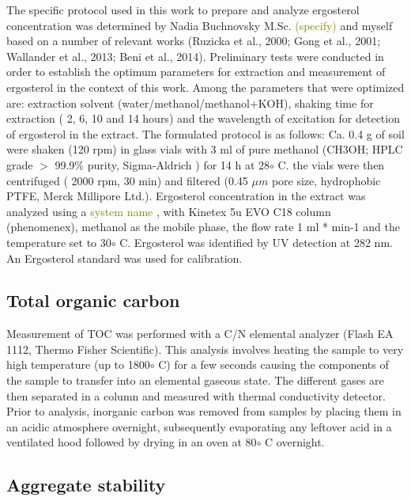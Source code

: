 \documentclass[12pt]{report}
\newcommand{\myGreen}[1]{\textcolor{olive}{#1}} %
\begin{document}
The specific protocol used in this work to prepare and analyze ergosterol concentration was determined by Nadia Buchnovsky M.Sc. \myGreen{(specify)} and myself based on a number of relevant works (Ruzicka et al., 2000; Gong et al., 2001; Wallander et al., 2013; Beni et al., 2014). Preliminary tests were conducted in order to establish the optimum parameters for extraction and measurement of ergosterol in the context of this work. Among the parameters that were optimized are: extraction solvent (water/methanol/methanol+KOH), shaking time for extraction ( 2, 6, 10 and 14 hours) and the wavelength of excitation for detection of ergosterol in the extract. The formulated protocol is as follows: Ca. 0.4 g of soil were shaken (120 rpm) in glass vials with 3 ml of pure methanol (CH3OH; HPLC grade $ > $ 99.9\% purity, Sigma-Aldrich ) for 14 h at 28$ \circ $ C. the vials were then centrifuged ( 2000 rpm, 30 min) and filtered (0.45 $ \mu m $ pore size, hydrophobic PTFE, Merck Millipore Ltd.). Ergosterol concentration in the extract was analyzed using a \myGreen{system name} , with Kinetex 5u EVO C18 column (phenomenex), methanol as the mobile phase, the flow rate 1 ml * min-1 and the temperature set to 30$ \circ $  C. Ergosterol was identified by UV detection at 282 nm. An Ergosterol standard was used for calibration.


\subsection{Total organic carbon}

Measurement of TOC was performed with a C/N elemental analyzer (Flash EA 1112, Thermo Fisher Scientific). This analysis involves heating the sample to very high temperature (up to 1800$\circ$ C) for a few seconds causing the components of the sample to transfer into an elemental gaseous state. The different gases are then separated in a column and measured with thermal conductivity detector. Prior to analysis, inorganic carbon was removed from samples by placing them in an acidic atmosphere overnight, subsequently evaporating any leftover acid in a ventilated hood followed by drying in an oven at 80$\circ$ C overnight. 


\subsection{Aggregate stability}
\end{document}
